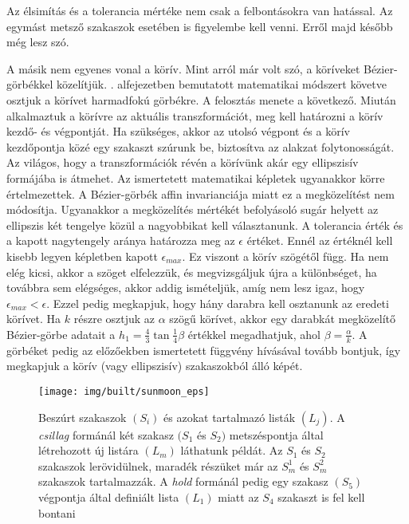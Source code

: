 \documentclass[12pt]{report}
\theoremstyle{definition}
\begin{document}
Az élsimítás és a tolerancia mértéke nem csak a felbontásokra van hatással. Az
egymást metsző szakaszok esetében is figyelembe kell venni. Erről majd később
még lesz szó.

A másik nem egyenes vonal a körív. Mint arról már volt szó, a köríveket
Bézier-görbékkel közelítjük. . alfejezetben bemutatott
matematikai módszert követve osztjuk a körívet harmadfokú görbékre. A
felosztás menete a következő. Miután alkalmaztuk a körívre az aktuális
transzformációt, meg kell határozni a körív kezdő- és végpontját. Ha
szükséges, akkor az utolsó végpont és a körív kezdőpontja közé egy szakaszt
szúrunk be, biztosítva az alakzat folytonosságát. Az világos, hogy a
transzformációk révén a körívünk akár egy ellipszisív formájába is
átmehet. Az ismertetett matematikai képletek ugyanakkor körre értelmezettek. A
Bézier-görbék affin invarianciája miatt ez a megközelítést nem módosítja.
Ugyanakkor a megközelítés mértékét befolyásoló sugár helyett az ellipszis két
tengelye közül a nagyobbikat kell választanunk. A tolerancia érték és a kapott
nagytengely aránya határozza meg az $\epsilon$ értéket. Ennél az értéknél kell
kisebb legyen  képletben kapott $\epsilon_{max}$. Ez viszont a
körív szögétől függ. Ha nem elég kicsi, akkor a szöget elfelezzük, és
megvizsgáljuk újra a különbséget, ha továbbra sem elégséges, akkor addig
ismételjük, amíg nem lesz igaz, hogy $\epsilon_{max} < \epsilon$. Ezzel pedig
megkapjuk, hogy hány darabra kell osztanunk az eredeti körívet. Ha $k$ részre
osztjuk az $\alpha$ szögű körívet, akkor egy darabkát megközelítő
Bézier-görbe adatait a $h_1 = \frac{4}{3} \tan{\frac{1}{4} \beta}$ értékkel
megadhatjuk, ahol $\beta = \frac{\alpha}{k}$. A görbéket pedig az előzőekben
ismertetett függvény hívásával tovább bontjuk, így megkapjuk a körív (vagy
ellipszisív) szakaszokból álló képét.

  \begin{figure}
    \centering \texttt{[image: img/built/sunmoon\_eps]}
    \caption{\label{fig:sunmoon} Beszúrt
    szakaszok $(S_i)$ és azokat tartalmazó listák $(L_j)$. A \emph{csillag}
    formánál két szakasz $(S_1$ és $S_2)$ metszéspontja által létrehozott új
    listára $(L_m)$ láthatunk példát. Az $S_1$ és $S_2$ szakaszok
    lerövidülnek, maradék részüket már az $S_m^1$ és $S_m^2$ szakaszok
    tartalmazzák. A \emph{hold} formánál pedig egy szakasz $(S_5)$
    végpontja által definiált lista $(L_1)$ miatt az $S_4$ szakaszt is fel
    kell bontani}
  \end{figure}
\end{document}
